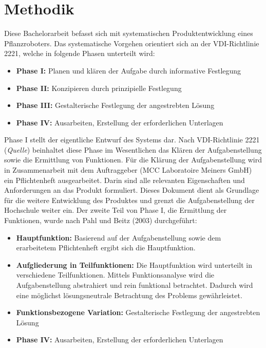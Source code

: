 \newpage
\section{Methodik}

Diese Bachelorarbeit befasst sich mit systematischen Produktentwicklung eines Pflanzroboters. Das systematische Vorgehen orientiert sich an der VDI-Richtlinie 2221, welche in folgende Phasen unterteilt wird:

\begin{itemize}
	\item \textbf{Phase I:} Planen und klären der Aufgabe durch informative Festlegung
	
	\item \textbf{Phase II:} Konzipieren durch prinzipielle Festlegung
	
	\item \textbf{Phase III:} Gestalterische Festlegung der angestrebten Lösung
	
	\item \textbf{Phase IV:} Ausarbeiten, Erstellung der erforderlichen Unterlagen
	
\end{itemize}

Phase I stellt der eigentliche Entwurf des Systems dar. Nach VDI-Richtlinie 2221 (\textit{Quelle}) beinhaltet diese Phase im Wesentlichen das Klären der Aufgabenstellung sowie die Ermittlung von Funktionen. Für die Klärung der Aufgabenstellung wird in Zusammenarbeit mit dem Auftraggeber (MCC Laboratoire Meiners GmbH) ein Pflichtenheft ausgearbeitet. Darin sind alle relevanten Eigenschaften und Anforderungen an das Produkt formuliert. Dieses Dokument dient als Grundlage für die weitere Entwicklung des Produktes und grenzt die Aufgabenstellung der Hochschule weiter ein. Der zweite Teil von Phase I, die Ermittlung der Funktionen, wurde nach Pahl und Beitz (2003) durchgeführt:

\begin{itemize}
	\item \textbf{Hauptfunktion:} Basierend auf der Aufgabenstellung sowie dem erarbeitetem Pflichtenheft ergibt sich die Hauptfunktion.
	
	\item \textbf{Aufgliederung in Teilfunktionen:} Die Hauptfunktion wird unterteilt in verschiedene Teilfunktionen. Mittels Funktionsanalyse wird die Aufgabenstellung abstrahiert und rein funktional betrachtet. Dadurch wird eine möglichst lösungsneutrale Betrachtung des Problems gewährleistet. 
	
	\item \textbf{Funktionsbezogene Variation:} Gestalterische Festlegung der angestrebten Lösung
	
	\item \textbf{Phase IV:} Ausarbeiten, Erstellung der erforderlichen Unterlagen
	
\end{itemize}